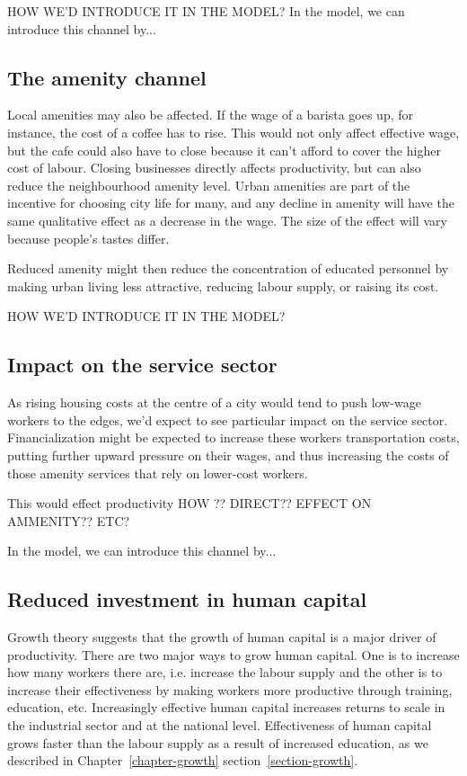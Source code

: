 {\color{red} HOW WE'D INTRODUCE IT IN THE MODEL?}
{\color{red} In the model, we can introduce this channel by...}


\subsection{The amenity channel}

Local amenities may also be affected. If the wage of a barista goes up, for instance, the cost of a coffee has to rise. This would not only affect effective wage, but the cafe could also have to close because it can't afford to cover the higher cost of labour. Closing businesses directly affects productivity, but can also reduce the neighbourhood amenity level. 
{\color{red} Urban amenities are part of the incentive for choosing city life for many, and any decline in amenity will have the same qualitative effect as a decrease in the wage.} The size of the effect will vary because people's tastes differ. 

Reduced amenity might then reduce 
the concentration of educated personnel by %
making urban living less attractive, reducing labour supply, or raising its cost.

{\color{red} HOW WE'D INTRODUCE IT IN THE MODEL?}

\subsection{Impact on the service sector}
As rising housing costs at the centre of a city would tend to push low-wage workers to the edges, we'd expect to see particular impact on the service sector. Financialization might be expected to increase these workers transportation costs, putting further upward pressure on their wages, and thus increasing the costs of those amenity services that rely on lower-cost workers. {\color{red}This would effect productivity HOW ?? DIRECT?? EFFECT ON AMMENITY?? ETC?

In the model, we can introduce this channel by...
}




\subsection{Reduced investment in human capital}

Growth theory suggests that the growth of human capital is  a major driver of productivity. There are two major ways to grow human capital. One is to increase how many workers there are, i.e. increase the labour supply and the other is to increase their effectiveness by making workers more productive through training, education, etc. Increasingly effective human capital increases returns to scale in the industrial sector and at the national level. Effectiveness of human capital grows faster than the labour supply as a result of increased education, as we described in Chapter~\ref{chapter-growth} section~\ref{section-growth}. 
 
